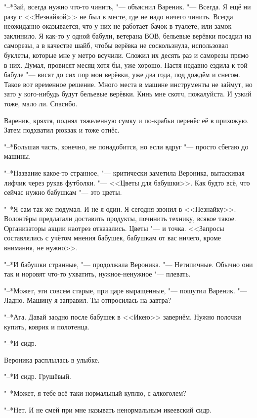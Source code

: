 "--*Зай, всегда нужно что-то чинить, "--- объяснил Вареник.
"--- Всегда.
Я ещё ни разу с <<Незнайкой>> не был в месте, где не надо ничего чинить.
Всегда неожиданно оказывается, что у них не работает бачок в туалете, или замок заклинило.
Я как-то у одной бабули, ветерана ВОВ, бельевые верёвки посадил на саморезы, а в качестве шайб, чтобы верёвка не соскользнула, использовал буклеты, которые мне у метро всучили.
Сложил их десять раз и саморезы прямо в них.
Думал, провисят месяц хотя бы, уже хорошо.
Настя недавно ездила к той бабуле "--- висят до сих пор мои верёвки, уже два года, под дождём и снегом.
Такое вот временное решение.
Много места в машине инструменты не займут, но зато у кого-нибудь будут бельевые верёвки.
Кинь мне скотч, пожалуйста.
И узкий тоже, мало ли.
Спасибо.

Вареник, кряхтя, поднял тяжеленную сумку и по-крабьи перенёс её в прихожую.
Затем подхватил рюкзак и тоже отнёс.

"--*Большая часть, конечно, не понадобится, но если вдруг "--- просто сбегаю до машины.

"--*Название какое-то странное, "--- критически заметила Вероника, вытаскивая лифчик через рукав футболки.
"--- <<Цветы для бабушки>>.
Как будто всё, что сейчас нужно бабушкам "--- это цветы.

"--*Я сам так же подумал.
И не я один.
Я сегодня звонил в <<Незнайку>>.
Волонтёры предлагали доставить продукты, починить технику, всякое такое.
Организаторы акции наотрез отказались.
Цветы "--- и точка.
<<Запросы составлялись с учётом мнения бабушек, бабушкам от вас ничего, кроме внимания, не нужно>>.

"--*И бабушки странные, "--- продолжала Вероника.
"--- Нетипичные.
Обычно они так и норовят что-то ухватить, нужное-ненужное "--- плевать.

"--*Может, эти совсем старые, при царе выращенные, "--- пошутил Вареник.
"--- Ладно.
Машину я заправил.
Ты отпросилась на завтра?

"--*Ага.
Давай заодно после бабушек в <<Икею>> завернём.
Нужно полочки купить, коврик и полотенца.

"--*И сидр.

Вероника расплылась в улыбке.

"--*И сидр.
Грушёвый.

"--*Может, я тебе всё-таки нормальный куплю, с алкоголем?

"--*Нет.
И не смей при мне называть ненормальным икеевский сидр.

\asterism

